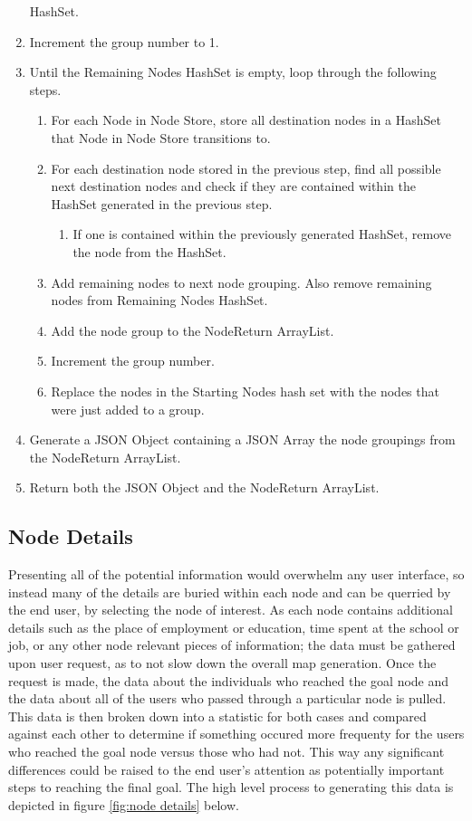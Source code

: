 \begin{enumerate}
   HashSet.
   \item Increment the group number to 1.
   \item Until the Remaining Nodes HashSet is empty, loop through the following
   steps.
   \begin{enumerate}
     \item For each Node in Node Store, store all destination nodes in a HashSet
     that Node in Node Store transitions to.
     \item For each destination node stored in the previous step, find all
     possible next destination nodes and check if they are contained within the
     HashSet generated in the previous step.
     \begin{enumerate}
       \item If one is contained within the previously generated HashSet, remove
       the node from the HashSet.
     \end{enumerate}
     \item Add remaining nodes to next node grouping.  Also remove remaining
     nodes from Remaining Nodes HashSet.
     \item Add the node group to the NodeReturn ArrayList.
     \item Increment the group number.
     \item Replace the nodes in the Starting Nodes hash set with the nodes that
     were just added to a group.
   \end{enumerate} 
   \item Generate a JSON Object containing a JSON Array the node groupings from
   the NodeReturn ArrayList.
   \item Return both the JSON Object and the NodeReturn ArrayList.
 \end{enumerate}



\subsection{Node Details}
Presenting all of the potential information would overwhelm any user interface,
so instead many of the details are buried within each node and can be querried
by the end user, by selecting the node of interest.  As each node contains
additional details such as the place of employment or education, time spent at
the school or job, or any other node relevant pieces of information; the data
must be gathered upon user request, as to not slow down the overall map
generation.  Once the request is made, the data about the individuals who
reached the goal node and the data about all of the users who passed through a
particular node is pulled.  This data is then broken down into a statistic for
both cases and compared against each other to determine if something occured
more frequenty for the users who reached the goal node versus those who had not.
This way any significant differences could be raised to the end user's attention
as potentially important steps to reaching the final goal.  The high level
process to generating this data is depicted in figure \ref{fig:node details}
below.

